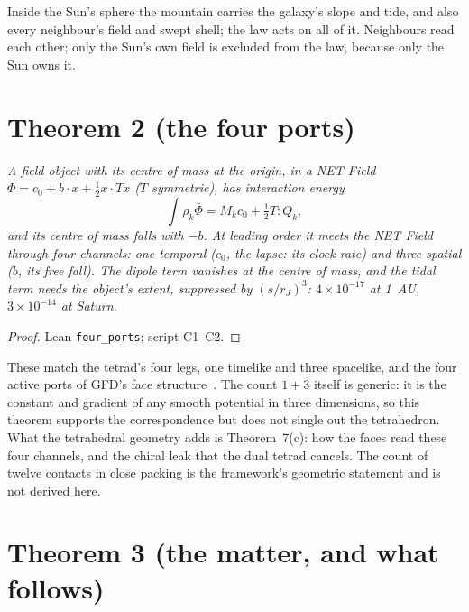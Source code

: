 \documentclass[twocolumn]{iopjournal}
\begin{document}
Inside the Sun's sphere the mountain carries the galaxy's slope and
tide, and also every neighbour's field and swept shell; the law acts
on all of it. Neighbours read each other; only the Sun's own field is
excluded from the law, because only the Sun owns it.


\section*{Theorem 2 (the four ports)}

\emph{A field object with its centre of mass at the origin, in a
NET Field $\bar\Phi = c_0 + b\cdot x + \tfrac12x\cdot T x$
($T$ symmetric), has interaction energy
\[
\textstyle\int\rho_k\bar\Phi = M_kc_0 + \tfrac12 T:Q_k ,
\]
and its centre of mass falls with $-b$. At leading order it meets the
NET Field through four channels: one temporal ($c_0$, the lapse: its
clock rate) and three spatial ($b$, its free fall). The dipole term
vanishes at the centre of mass, and the tidal term needs the object's
extent, suppressed by $(s/r_J)^3$: $4\times10^{-17}$ at 1~AU,
$3\times10^{-14}$ at Saturn.}

\begin{proof}
Lean \texttt{four\_ports}; script C1--C2.
\end{proof}

These match the tetrad's four legs, one timelike and three spacelike,
and the four active ports of GFD's face structure~\cite{NelsonIV,
NelsonFace}. The count $1 + 3$ itself is generic: it is the constant
and gradient of any smooth potential in three dimensions, so this
theorem supports the correspondence but does not single out the
tetrahedron. What the tetrahedral geometry adds is Theorem~7(c): how
the faces read these four channels, and the chiral leak that the dual
tetrad cancels. The count of twelve contacts in
close packing is the framework's geometric statement and is not derived
here.


\section*{Theorem 3 (the matter, and what follows)}
\end{document}
